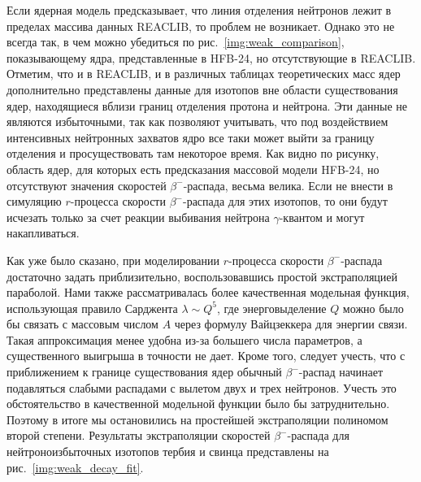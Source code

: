   Если ядерная модель предсказывает, что линия отделения нейтронов лежит в пределах массива данных REACLIB, то проблем не возникает. Однако это не всегда так, в чем можно убедиться по рис.~\ref{img:weak_comparison}, показывающему ядра, представленные в HFB-24, но отсутствующие в REACLIB. Отметим, что и в REACLIB, и в различных таблицах теоретических масс ядер дополнительно представлены данные для изотопов вне области существования ядер, находящиеся вблизи границ отделения протона и нейтрона. Эти данные не являются избыточными, так как позволяют учитывать, что под воздействием интенсивных нейтронных захватов ядро все таки может выйти за границу отделения и просуществовать там некоторое время. Как видно по рисунку, область ядер, для которых есть предсказания массовой модели HFB-24, но отсутствуют значения скоростей $\beta^-$-распада, весьма велика. Если не внести в симуляцию $r$-процесса скорости $\beta^-$-распада для этих изотопов, то они будут исчезать только за счет реакции выбивания нейтрона $\gamma$-квантом и могут накапливаться.    

  Как уже было сказано, при моделировании $r$-процесса скорости $\beta^-$-распада достаточно задать приблизительно, воспользовавшись простой экстраполяцией параболой. Нами также рассматривалась более качественная модельная функция, использующая правило Сарджента $\lambda \sim Q^5$, где энерговыделение $Q$ можно было бы связать с массовым числом $A$ через формулу Вайцзеккера для энергии связи. Такая аппроксимация менее удобна из-за большего числа параметров, а существенного выигрыша в точности не дает. Кроме того, следует учесть, что с приближением к границе существования ядер обычный $\beta^-$-распад начинает подавляться слабыми распадами с вылетом двух и трех нейтронов. Учесть это обстоятельство в качественной модельной функции было бы затруднительно. Поэтому в итоге мы остановились на простейшей экстраполяции полиномом второй степени. Результаты экстраполяции скоростей $\beta^-$-распада для нейтроноизбыточных изотопов тербия и свинца представлены на рис.~\ref{img:weak_decay_fit}.

